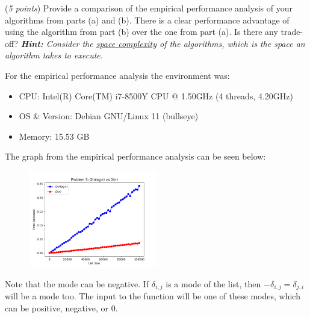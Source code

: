 \documentclass{hw}
\begin{document}
\begin{problem}
    \begin{subproblem}
        (\textit{5 points})
        Provide a comparison of the empirical performance analysis of your algorithms from parts (a) and (b). There is a clear performance advantage of using the algorithm from part (b) over the one from part (a). Is there any trade-off? \textit{\textbf{Hint:} Consider the \href{https://en.wikipedia.org/wiki/Space_complexity}{space complexity} of the algorithms, which is the space an algorithm takes to execute.}
    \end{subproblem}

    \begin{solution}
        For the empirical performance analysis the environment was:
        \begin{itemize}
            \item CPU: Intel(R) Core(TM) i7-8500Y CPU @ 1.50GHz (4 threads, 4.20GHz)
            \item OS \& Version: Debian GNU/Linux 11 (bullseye)
            \item Memory: 15.53 GB
        \end{itemize}
            
        The graph from the empirical performance analysis can be seen below:
        \begin{figure}[ht]
          \centering
              \includegraphics[width=0.5\textwidth]{figures/problem-4.png}
        \end{figure}
    \end{solution}
    
    Note that the mode can be negative. If $\delta_{i, j}$ is a mode of the list, then $-\delta_{i, j} = \delta_{j, i}$ will be a mode too. The input to the function will be one of these modes, which can be positive, negative, or 0.
\end{problem}

\newpage

\end{document}
